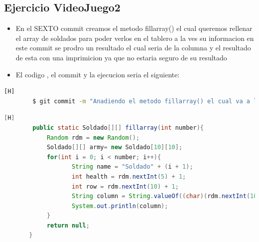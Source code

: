 \documentclass{article}
\begin{document}
	\subsection{Ejercicio VideoJuego2}
	\begin{itemize}	
		\item En el SEXTO commit creamos el metodo fillarray() el cual queremos rellenar el array de soldados para poder verlos en el tablero a la ves su informacion en este commit se prodro un resultado el cual seria de la columna y el resultado de esta con una imprimicion ya que no estaria seguro de su resultado
		\item El codigo , el commit y la ejecucion seria el siguiente:
	\end{itemize}	
	\begin{lstlisting}[language=bash,caption={Commit}][H]
		$ git commit -m "Anadiendo el metodo fillarray() el cual va a llenar nuestro arreglo de soldados para eso necesitabamos su nombre su vida su fila y su columna la cual yo quiero probar la cilumna lo que imprime para que compruebe que este saliendo lo esperado un letra la cual nos de su posicion"
	\end{lstlisting}	
	\begin{lstlisting}[language=java,caption={Las lineas de codigos del metodo creado:}][H]
		public static Soldado[][] fillarray(int number){
			Random rdm = new Random();
			Soldado[][] army= new Soldado[10][10];
			for(int i = 0; i < number; i++){
				   String name = "Soldado" + (i + 1);
				   int health = rdm.nextInt(5) + 1;
				   int row = rdm.nextInt(10) + 1;
				   String column = String.valueOf((char)(rdm.nextInt(10) + 65));  
				   System.out.println(column);    
			}
			return null;
	   }
	\end{lstlisting}
\end{document}
